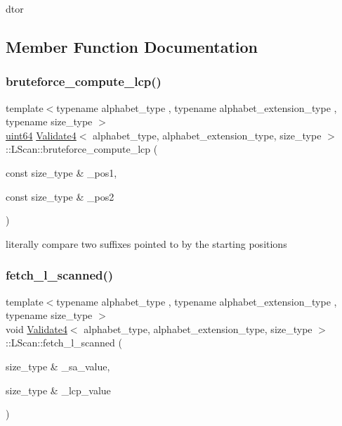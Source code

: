 dtor 



\subsection{Member Function Documentation}
\mbox{\label{struct_validate4_1_1_l_scan_a9e88ab70a4b681b145bd79fa05d8f13d}} 
\subsubsection{\texorpdfstring{bruteforce\+\_\+compute\+\_\+lcp()}{bruteforce\_compute\_lcp()}}
{\footnotesize\ttfamily template$<$typename alphabet\+\_\+type , typename alphabet\+\_\+extension\+\_\+type , typename size\+\_\+type $>$ \\
\hyperlink{types_8h_a60e8696a4678cd348e991a1f172e53f7}{uint64} \hyperlink{class_validate4}{Validate4}$<$ alphabet\+\_\+type, alphabet\+\_\+extension\+\_\+type, size\+\_\+type $>$\+::L\+Scan\+::bruteforce\+\_\+compute\+\_\+lcp (\begin{DoxyParamCaption}\item[{const size\+\_\+type \&}]{\+\_\+pos1,  }\item[{const size\+\_\+type \&}]{\+\_\+pos2 }\end{DoxyParamCaption})\hspace{0.3cm}{\ttfamily [inline]}}



literally compare two suffixes pointed to by the starting positions 

\mbox{\label{struct_validate4_1_1_l_scan_a1fabfd83060b51fdedd46b413da0f060}} 
\subsubsection{\texorpdfstring{fetch\+\_\+l\+\_\+scanned()}{fetch\_l\_scanned()}}
{\footnotesize\ttfamily template$<$typename alphabet\+\_\+type , typename alphabet\+\_\+extension\+\_\+type , typename size\+\_\+type $>$ \\
void \hyperlink{class_validate4}{Validate4}$<$ alphabet\+\_\+type, alphabet\+\_\+extension\+\_\+type, size\+\_\+type $>$\+::L\+Scan\+::fetch\+\_\+l\+\_\+scanned (\begin{DoxyParamCaption}\item[{size\+\_\+type \&}]{\+\_\+sa\+\_\+value,  }\item[{size\+\_\+type \&}]{\+\_\+lcp\+\_\+value }\end{DoxyParamCaption})\hspace{0.3cm}{\ttfamily [inline]}}



